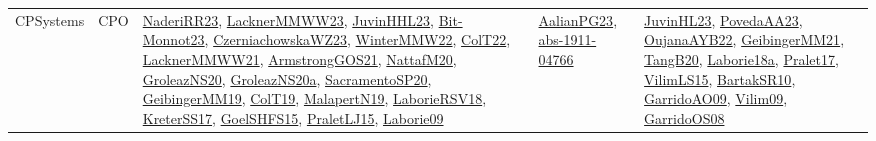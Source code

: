 {\begin{longtable}{lp{3cm}>{\raggedright}p{6cm}>{\raggedright}p{6cm}p{8cm}}
CPSystems & CPO & \href{articles/NaderiRR23.pdf}{NaderiRR23}\cite{NaderiRR23}, \href{articles/LacknerMMWW23.pdf}{LacknerMMWW23}\cite{LacknerMMWW23}, \href{papers/JuvinHHL23.pdf}{JuvinHHL23}\cite{JuvinHHL23}, \href{papers/Bit-Monnot23.pdf}{Bit-Monnot23}\cite{Bit-Monnot23}, \href{articles/CzerniachowskaWZ23.pdf}{CzerniachowskaWZ23}\cite{CzerniachowskaWZ23}, \href{papers/WinterMMW22.pdf}{WinterMMW22}\cite{WinterMMW22}, \href{articles/ColT22.pdf}{ColT22}\cite{ColT22}, \href{papers/LacknerMMWW21.pdf}{LacknerMMWW21}\cite{LacknerMMWW21}, \href{papers/ArmstrongGOS21.pdf}{ArmstrongGOS21}\cite{ArmstrongGOS21}, \href{papers/NattafM20.pdf}{NattafM20}\cite{NattafM20}, \href{papers/GroleazNS20.pdf}{GroleazNS20}\cite{GroleazNS20}, \href{papers/GroleazNS20a.pdf}{GroleazNS20a}\cite{GroleazNS20a}, \href{articles/SacramentoSP20.pdf}{SacramentoSP20}\cite{SacramentoSP20}, \href{papers/GeibingerMM19.pdf}{GeibingerMM19}\cite{GeibingerMM19}, \href{papers/ColT19.pdf}{ColT19}\cite{ColT19}, \href{papers/MalapertN19.pdf}{MalapertN19}\cite{MalapertN19}, \href{articles/LaborieRSV18.pdf}{LaborieRSV18}\cite{LaborieRSV18}, \href{articles/KreterSS17.pdf}{KreterSS17}\cite{KreterSS17}, \href{articles/GoelSHFS15.pdf}{GoelSHFS15}\cite{GoelSHFS15}, \href{papers/PraletLJ15.pdf}{PraletLJ15}\cite{PraletLJ15}, \href{papers/Laborie09.pdf}{Laborie09}\cite{Laborie09} & \href{papers/AalianPG23.pdf}{AalianPG23}\cite{AalianPG23}, \href{articles/abs-1911-04766.pdf}{abs-1911-04766}\cite{abs-1911-04766} & \href{papers/JuvinHL23.pdf}{JuvinHL23}\cite{JuvinHL23}, \href{papers/PovedaAA23.pdf}{PovedaAA23}\cite{PovedaAA23}, \href{papers/OujanaAYB22.pdf}{OujanaAYB22}\cite{OujanaAYB22}, \href{papers/GeibingerMM21.pdf}{GeibingerMM21}\cite{GeibingerMM21}, \href{papers/TangB20.pdf}{TangB20}\cite{TangB20}, \href{papers/Laborie18a.pdf}{Laborie18a}\cite{Laborie18a}, \href{papers/Pralet17.pdf}{Pralet17}\cite{Pralet17}, \href{papers/VilimLS15.pdf}{VilimLS15}\cite{VilimLS15}, \href{articles/BartakSR10.pdf}{BartakSR10}\cite{BartakSR10}, \href{articles/GarridoAO09.pdf}{GarridoAO09}\cite{GarridoAO09}, \href{papers/Vilim09.pdf}{Vilim09}\cite{Vilim09}, \href{articles/GarridoOS08.pdf}{GarridoOS08}\cite{GarridoOS08}\\

\end{longtable}}
